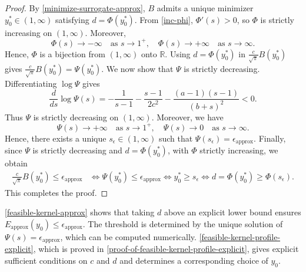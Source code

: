 \documentclass[10pt,reqno]{article}
\numberwithin{equation}{section}
\theoremstyle{plain}
\theoremstyle{definition}
\begin{document}
\begin{proof}
By \cref{minimize-surrogate-approx}, \(B\) admits a unique minimizer \(y_0^\ast\in(1,\infty)\) satisfying \(d=\Phi(y_0^\ast)\). From \cref{inc-phi}, \(\Phi'(s)>0\), so \(\Phi\) is strictly increasing on \((1,\infty)\). Moreover,
\begin{equation}
\Phi(s)\to -\infty \quad \text{as } s\to 1^+, \quad \Phi(s)\to +\infty \quad \text{as } s\to \infty.
\end{equation}
Hence, \(\Phi\) is a bijection from \((1,\infty)\) onto \(\mathbb{R}\). Using \(d=\Phi(y_0^\ast)\) in \(\frac{c}{\sqrt{\pi}}B(y_0^\ast)\) gives \(\frac{c}{\sqrt{\pi}}B(y_0^\ast)=\Psi(y_0^\ast)\). We now show that \(\Psi\) is strictly decreasing. Differentiating \(\log\Psi\) gives
\begin{equation}
\frac{d}{ds}\log \Psi(s) = -\frac{1}{s-1}-\frac{s-1}{2c^2}-\frac{(a-1)(s-1)}{(b+s)^2}<0.
\end{equation}
Thus \(\Psi\) is strictly decreasing on \((1,\infty)\). Moreover, we have
\begin{equation}
\Psi(s)\to +\infty \quad \text{as } s\to 1^+, \quad \Psi(s)\to 0 \quad \text{as } s\to \infty.
\end{equation}
Hence, there exists a unique \(s_\epsilon\in(1,\infty)\) such that \(\Psi(s_\epsilon)=\epsilon_{\operatorname{approx}}\). Finally, since \(\Psi\) is strictly decreasing and \(d=\Phi(y_0^\ast)\), with \(\Phi\) strictly increasing, we obtain
\begin{align}
\frac{c}{\sqrt{\pi}}B(y_0^\ast)\le \epsilon_{\operatorname{approx}} &\iff \Psi(y_0^\ast)\le \epsilon_{\operatorname{approx}} \iff y_0^\ast \ge s_\epsilon \iff d=\Phi(y_0^\ast)\ge \Phi(s_\epsilon).
\end{align}
This completes the proof.
\end{proof}

\cref{feasible-kernel-approx} shows that taking \(d\) above an explicit lower bound ensures \(E_{\mathrm{approx}}(y_0)\leq \epsilon_{\mathrm{approx}}\). The threshold is determined by the unique solution of \(\Psi(s)=\epsilon_{\mathrm{approx}}\), which can be computed numerically. \cref{feasible-kernel-profile-explicit}, which is proved in \cref{proof-of-feasible-kernel-profile-explicit}, gives explicit sufficient conditions on $c$ and \(d\) and determines a corresponding choice of \(y_0\).
\end{document}
